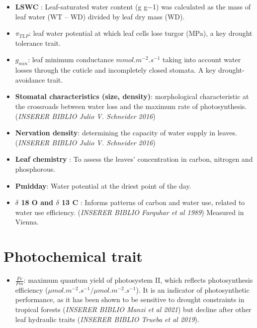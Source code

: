 \documentclass[
]{book}
\providecommand{\tightlist}{%
  \setlength{\itemsep}{0pt}\setlength{\parskip}{0pt}}
\begin{document}
\begin{itemize}
\tightlist
\item
  \textbf{LSWC} : Leaf-saturated water content (g g−1) was calculated as the mass of leaf water (WT -- WD) divided by leaf dry mass (WD).
\item
  \textbf{\(\pi_{TLP}\)}: leaf water potential at which leaf cells lose turgor (MPa), a key drought tolerance trait.
\item
  \textbf{\(g_{min}\)}: leaf minimum conductance \(mmol.m^{-2}.s^{-1}\) taking into account water losses through the cuticle and incompletely closed stomata. A key drought-avoidance trait.
\item
  \textbf{Stomatal characteristics (size, density)}: morphological characteristic at the crossroads between water loss and the maximum rate of photosynthesis.(\emph{INSERER BIBLIO Julio V. Schneider 2016})
\item
  \textbf{Nervation density}: determining the capacity of water supply in leaves. (\emph{INSERER BIBLIO Julio V. Schneider 2016})
\item
  \textbf{Leaf chemistry} : To assess the leaves' concentration in carbon, nitrogen and phosphorous.
\item
  \textbf{Pmidday}: Water potential at the driest point of the day.
\item
  \textbf{\(\delta\) 18 O and \(\delta\) 13 C} : Informs patterns of carbon and water use, related to water use efficiency. (\emph{INSERER BIBLIO Farquhar et al 1989}) Measured in Vienna.
\end{itemize}

\hypertarget{photochemical-trait}{%
\section{Photochemical trait}\label{photochemical-trait}}

\begin{itemize}
\tightlist
\item
  \textbf{\(\frac{Fv}{Fm}\)}: maximum quantum yield of photosystem II, which reflects photosynthesis efficiency (\(\mu mol . m^{-2} . s^{-1}/ \mu mol . m^{-2} . s^{-1}\)). It is an indicator of photosynthetic performance, as it has been shown to be sensitive to drought constraints in tropical forests (\emph{INSERER BIBLIO Manzi et al 2021}) but decline after other leaf hydraulic traits (\emph{INSERER BIBLIO Trueba et al 2019}).
\end{itemize}
\end{document}
